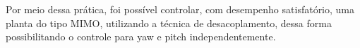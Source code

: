 Por meio dessa prática, foi possível controlar, com desempenho satisfatório,
 uma planta do tipo MIMO, utilizando a técnica de desacoplamento, dessa forma
  possibilitando o controle para yaw e pitch independentemente. 